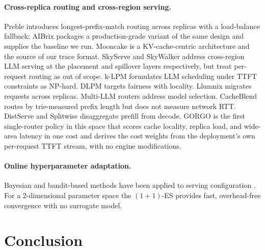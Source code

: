 \documentclass{article}
\begin{document}
\paragraph{Cross-replica routing and cross-region serving.}
Preble \citep{preble} introduces longest-prefix-match routing across replicas
with a load-balance fallback; AIBrix \citep{aibrix2024} packages a
production-grade variant of the same design and supplies the baseline we run.
Mooncake \citep{qin2024mooncake} is a KV-cache-centric architecture and the
source of our trace format. SkyServe \citep{skyserve} and SkyWalker
\citep{skywalker} address cross-region LLM serving at the placement and
spillover layers respectively, but treat per-request routing as out of scope.
k-LPM \citep{klpm2025} formulates LLM scheduling under TTFT constraints as
NP-hard. DLPM \citep{dlpm2025} targets fairness with locality. Llumnix
\citep{llumnix2024} migrates requests across replicas. Multi-LLM routers
\citep{routerwu2025} address model selection. CacheBlend
\citep{yao2024cacheblend} routes by trie-measured prefix length but does not
measure network RTT. DistServe \citep{distserve2024} and Splitwise
\citep{splitwise2024} disaggregate prefill from decode. GORGO is the first
single-router policy in this space that scores cache locality, replica load,
and wide-area latency in one cost and derives the cost weights from the
deployment's own per-request TTFT stream, with no engine modifications.

\paragraph{Online hyperparameter adaptation.}
Bayesian and bandit-based methods have been applied to serving configuration
\citep{routerwu2025}. For a 2-dimensional parameter space the $(1{+}1)$-ES
\citep{rechenberg1973} provides fast, overhead-free convergence with no
surrogate model.

\section{Conclusion}
\label{sec:conclusion}
\end{document}
